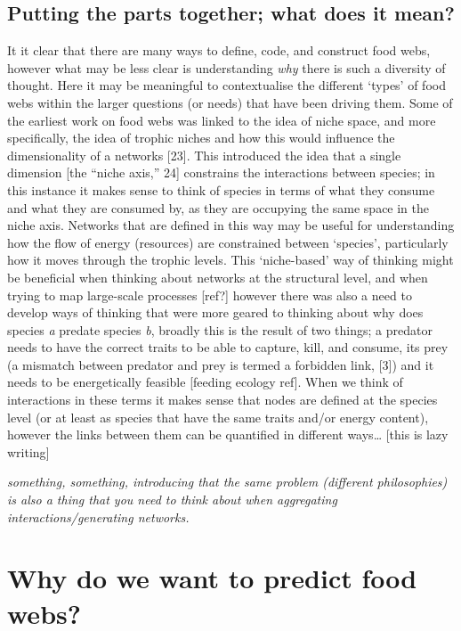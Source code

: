 \documentclass[
]{article}
\begin{document}
\subsection{Putting the parts together; what does it
mean?}\label{putting-the-parts-together-what-does-it-mean}

It it clear that there are many ways to define, code, and construct food
webs, however what may be less clear is understanding \emph{why} there
is such a diversity of thought. Here it may be meaningful to
contextualise the different `types' of food webs within the larger
questions (or needs) that have been driving them. Some of the earliest
work on food webs was linked to the idea of niche space, and more
specifically, the idea of trophic niches and how this would influence
the dimensionality of a networks {[}23{]}. This introduced the idea that
a single dimension {[}the ``niche axis,'' 24{]} constrains the
interactions between species; in this instance it makes sense to think
of species in terms of what they consume and what they are consumed by,
as they are occupying the same space in the niche axis. Networks that
are defined in this way may be useful for understanding how the flow of
energy (resources) are constrained between `species', particularly how
it moves through the trophic levels. This `niche-based' way of thinking
might be beneficial when thinking about networks at the structural
level, and when trying to map large-scale processes {[}ref?{]} however
there was also a need to develop ways of thinking that were more geared
to thinking about why does species \emph{a} predate species \emph{b},
broadly this is the result of two things; a predator needs to have the
correct traits to be able to capture, kill, and consume, its prey (a
mismatch between predator and prey is termed a forbidden link, {[}3{]})
and it needs to be energetically feasible {[}feeding ecology ref{]}.
When we think of interactions in these terms it makes sense that nodes
are defined at the species level (or at least as species that have the
same traits and/or energy content), however the links between them can
be quantified in different ways\ldots{} {[}this is lazy writing{]}

\emph{something, something, introducing that the same problem (different
philosophies) is also a thing that you need to think about when
aggregating interactions/generating networks.}

\section{Why do we want to predict food webs?}\label{sec-network-why}
\end{document}
